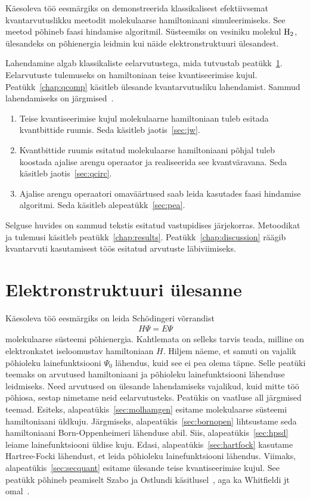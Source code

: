 \documentclass[12pt]{report}
\begin{document}
Käesoleva töö eesmärgiks on demonstreerida klassikalisest efektiivsemat kvantarvutuslikku meetodit molekulaarse hamiltoniaani simuleerimiseks.
See meetod põhineb faasi hindamise algoritmil.
Süsteemiks on vesiniku molekul \(\rm H_2\), ülesandeks on põhienergia leidmin kui näide elektronstruktuuri ülesandest.

Lahendamine algab klassikaliste eelarvutustega, mida tutvustab peatükk~\ref{chap:qchem}.
Eelarvutuste tulemuseks on hamiltoniaan teise kvantiseerimise kujul.
Peatükk~\ref{chap:qcomp} käsitleb ülesande kvantarvutusliku lahendamist.
Sammud lahendamiseks on järgmised~\cite{whitfield+etal2011}.

\begin{enumerate}
    \item Teise kvantiseerimise kujul molekulaarne hamiltoniaan tuleb esitada kvantbittide ruumis.
    Seda käsitleb jaotis~\ref{sec:jw}.
    \item Kvantbittide ruumis esitatud molekulaarse hamiltoniaani põhjal tuleb koostada ajalise arengu operaator ja realiseerida see kvantväravana.
    Seda käsitleb jaotis~\ref{sec:qcirc}.
    \item Ajalise arengu operaatori omaväärtused saab leida kasutades faasi hindamise algoritmi.
    Seda käsitleb alepeatükk~\ref{sec:pea}.
\end{enumerate}
Selguse huvides on sammud tekstis esitatud vastupidises järjekorras.
Metoodikat ja tulemusi käsitleb peatükk~\ref{chap:results}.
Peatükk~\ref{chap:discussion} räägib kvantarvuti kasutamisest töös esitatud arvutuste läbiviimiseks.

\chapter{Elektronstruktuuri ülesanne}\label{chap:qchem}

Käesoleva töö eesmärgiks on leida Schödingeri võrrandist
\begin{align}\label{eq:schro}
    H \Psi = E \Psi
\end{align}
molekulaarse süsteemi põhienergia.
Kahtlemata on selleks tarvis teada, milline on elektronkatet iseloomustav hamiltoniaan \(H\).
Hiljem näeme, et samuti on vajalik põhioleku lainefunktsiooni $\Psi_0$ lähendus, kuid see ei pea olema täpne.
Selle peatüki teemaks on arvutused hamiltoniaani ja põhioleku lainefunktsiooni lähenduse leidmiseks.
Need arvutused on ülesande lahendamiseks vajalikud, kuid mitte töö põhiosa, sestap nimetame neid eelarvutusteks.
Peatükis on vaatluse all järgmised teemad.
Esiteks, alapeatükis~\ref{sec:molhamgen} esitame molekulaarse süsteemi hamiltoniaani üld\-kuju.
Järgmiseks, alapeatükis~\ref{sec:bornopen} lihtsustame seda hamiltoniaani Born-Oppenheimeri lähenduse abil.
Siis, alapeatükis~\ref{sec:hpsd} leiame lainefunktsiooni üldise kuju.
Edasi, alapeatükis~\ref{sec:hartfock} kasutame Hartree-Focki lähendust, et leida põhioleku lainefunktsiooni lähendus.
Viimaks, alapeatükis~\ref{sec:secquant} esitame ülesande teise kvantiseerimise kujul.
See peatükk põhineb peamiselt Szabo ja Ostlundi käsitlusel~\cite{szabo+ostlund}, aga ka Whitfieldi jt omal~\cite{whitfield+etal2011}.
\end{document}
